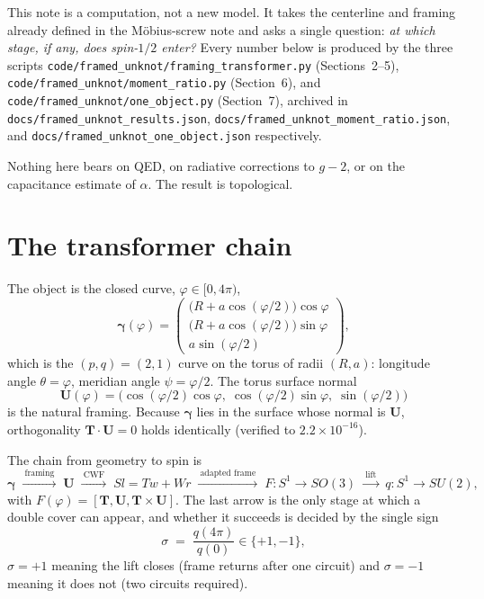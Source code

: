 \documentclass[11pt,a4paper]{article}
\begin{document}
This note is a computation, not a new model.  It takes the centerline and
framing already defined in the M\"obius-screw note and asks a single
question: \emph{at which stage, if any, does spin-$1/2$ enter?}  Every
number below is produced by the three scripts
\nolinkurl{code/framed_unknot/framing_transformer.py} (Sections~2--5),
\nolinkurl{code/framed_unknot/moment_ratio.py} (Section~6), and
\nolinkurl{code/framed_unknot/one_object.py} (Section~7), archived in
\nolinkurl{docs/framed_unknot_results.json},
\nolinkurl{docs/framed_unknot_moment_ratio.json}, and
\nolinkurl{docs/framed_unknot_one_object.json} respectively.

Nothing here bears on QED, on radiative corrections to $g-2$, or on the
capacitance estimate of $\alpha$.  The result is topological.

\section{The transformer chain}

The object is the closed curve, $\varphi \in [0,4\pi)$,
\begin{equation}
\label{eq:curve}
\bm{\gamma}(\varphi) =
\begin{pmatrix}
\bigl(R + a\cos(\varphi/2)\bigr)\cos\varphi \\
\bigl(R + a\cos(\varphi/2)\bigr)\sin\varphi \\
a\sin(\varphi/2)
\end{pmatrix},
\end{equation}
which is the $(p,q) = (2,1)$ curve on the torus of radii $(R,a)$:
longitude angle $\theta = \varphi$, meridian angle $\psi = \varphi/2$.
The torus surface normal
\begin{equation}
\label{eq:framing}
\bm{U}(\varphi) = \bigl(\cos(\varphi/2)\cos\varphi,\;
                        \cos(\varphi/2)\sin\varphi,\;
                        \sin(\varphi/2)\bigr)
\end{equation}
is the natural framing.  Because $\bm{\gamma}$ lies in the surface whose
normal is $\bm{U}$, orthogonality $\bm{T}\cdot\bm{U} = 0$ holds
identically (verified to $2.2\times10^{-16}$).

The chain from geometry to spin is
\[
\bm{\gamma}
\;\xrightarrow{\ \text{framing}\ }\;
\bm{U}
\;\xrightarrow{\ \text{CWF}\ }\;
Sl = Tw + Wr
\;\xrightarrow{\ \text{adapted frame}\ }\;
F : S^1 \to SO(3)
\;\xrightarrow{\ \text{lift}\ }\;
q : S^1 \to SU(2),
\]
with $F(\varphi) = [\bm{T},\bm{U},\bm{T}\times\bm{U}]$.  The last arrow is
the only stage at which a double cover can appear, and whether it
succeeds is decided by the single sign
\begin{equation}
\label{eq:sigma}
\sigma \;=\; \frac{q(4\pi)}{q(0)} \in \{+1,-1\},
\end{equation}
$\sigma = +1$ meaning the lift closes (frame returns after one circuit)
and $\sigma = -1$ meaning it does not (two circuits required).
\end{document}
